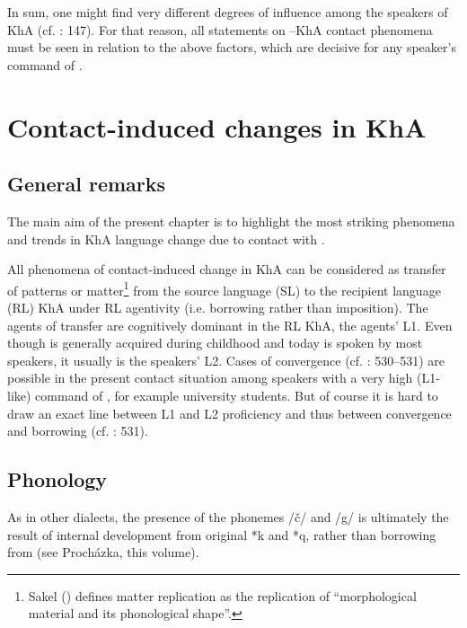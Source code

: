 \documentclass[output=paper,nonflat]{langsci/langscibook}
\begin{document}
In sum, one might find very different degrees of  influence among the speakers of KhA (cf. \citealt{MatrasShabibi2007}: 147). For that reason, all statements on –KhA contact phenomena must be seen in relation to the above factors, which are decisive for any speaker’s command of . 

\section{Contact-induced changes in KhA} 
\subsection{General remarks\footnotemark}
The main aim of the present chapter is to highlight the most striking phenomena and trends in KhA {language change} due to contact with .


All phenomena of contact-induced change in KhA can be considered as {transfer} of patterns or matter\footnote{Sakel (\citeyear[15]{Sakel2007}) defines matter {replication} as the {replication} of “morphological material and its phonological shape”.} from the {source language} ({SL})  to the {recipient language} ({RL}) KhA under {RL} agentivity (i.e. borrowing rather than {imposition}).{} The agents of {transfer} are cognitively dominant in the {RL} KhA, the agents’ L1. Even though  is generally acquired during childhood and today is spoken by most speakers, it usually is the speakers’ L2. Cases of {convergence} (cf. \citealt{Lucas2015}: 530–531) are possible in the present contact situation among speakers with a very high (L1-like) command of , for example university students. But of course it is hard to draw an exact line between L1 and L2 proficiency and thus between {convergence} and borrowing (cf. \citealt{Lucas2015}: 531). 



\subsection{Phonology}
As in other   dialects, the presence of the phonemes /č/ and /g/ is ultimately the result of internal development from original *k and *q, rather than borrowing from  (see Procházka, this volume).
\end{document}
